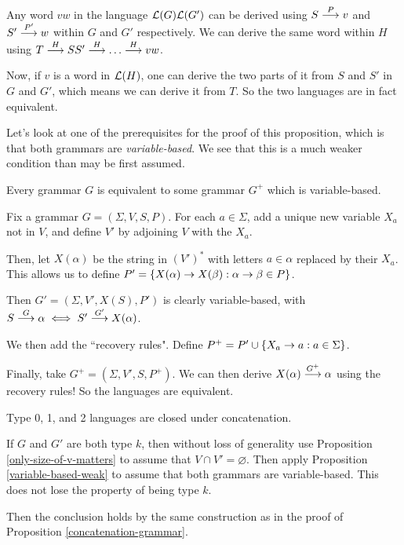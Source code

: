 \documentclass{article}
\begin{document}
\begin{prf}
	Any word $vw$ in the language $\mathcal{L}(G)\mathcal{L}(G')$ can be derived using $S \stackrel{P}{\longrightarrow} v$ and $S' \stackrel{P'}{\longrightarrow} w$ within $G$ and $G'$ respectively. We can derive the same word within $H$ using $T \stackrel{H}{\longrightarrow} SS' \stackrel{H}{\longrightarrow} \dots \stackrel{H}{\longrightarrow} vw$.
	    
	Now, if $v$ is a word in $\mathcal{L}(H)$, one can derive the two parts of it from $S$ and $S'$ in $G$ and $G'$, which means we can derive it from $T$. So the two languages are in fact equivalent.
\end{prf}
 
Let's look at one of the prerequisites for the proof of this proposition, which is that both grammars are \textit{variable-based}. We see that this is a much weaker condition than may be first assumed.

\begin{proposition}
	\label{variable-based-weak}
	Every grammar $G$ is equivalent to some grammar $G^+$ which is variable-based.
\end{proposition}

\begin{prf}
	Fix a grammar $G = (\Sigma, V, S, P)$. For each $a \in \Sigma$, add a unique new variable $X_a$ not in $V$, and define $V'$ by adjoining $V$ with the $X_a$.
	    
	Then, let $X(\alpha)$ be the string in $(V')^*$ with letters $a \in \alpha$ replaced by their $X_a$. This allows us to define $P' = \left\lbrace X(\alpha) \to X(\beta): \alpha \to \beta \in P \right\rbrace$.
	    
	Then $G' = (\Sigma, V', X(S), P')$ is clearly variable-based, with $S \stackrel{G}{\longrightarrow} \alpha \iff S' \stackrel{G'}{\longrightarrow} X(\alpha)$.
	    
	We then add the ``recovery rules". Define $P^+ = P' \cup \left\lbrace X_a \to a: a \in \Sigma \right\rbrace$.
	    
	Finally, take $G^+ = (\Sigma, V', S, P^+)$. We can then derive $X(\alpha) \stackrel{G^+}{\longrightarrow} \alpha$ using the recovery rules! So the languages are equivalent.
\end{prf}

\begin{corollary}
	Type 0, 1, and 2 languages are closed under concatenation.
\end{corollary}

\begin{prf}
	If $G$ and $G'$ are both type $k$, then without loss of generality use Proposition \ref{only-size-of-v-matters} to assume that $V \cap V' = \varnothing$. Then apply Proposition \ref{variable-based-weak} to assume that both grammars are variable-based. This does not lose the property of being type $k$.
	    
	Then the conclusion holds by the same construction as in the proof of Proposition \ref{concatenation-grammar}.
\end{prf}
\end{document}
